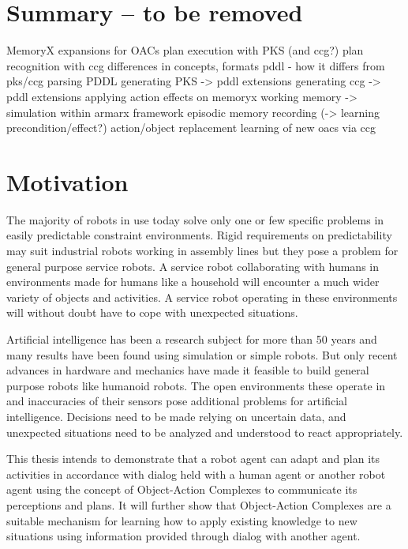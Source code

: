 \documentclass[english,ngerman]{KITreprt}
\begin{document}


\chapter{Summary -- to be removed}
MemoryX expansions for OACs
plan execution with PKS (and ccg?)
plan recognition with ccg
differences in concepts, formats
pddl - how it differs from pks/ccg
parsing PDDL
generating PKS
-> pddl extensions
generating ccg
-> pddl extensions
applying action effects on memoryx working memory
-> simulation within armarx framework
episodic memory recording (-> learning precondition/effect?)
action/object replacement
learning of new oacs via ccg

\maketitle


\tableofcontents
\chapter{Motivation}
The majority of robots in use today solve only one or few specific problems in
easily predictable constraint environments. Rigid requirements on predictability
may suit industrial robots working in assembly lines but they pose a problem for
general purpose service robots. A service robot collaborating with humans in
environments made for humans like a household will encounter a much wider variety
of objects and activities. A service robot operating in these environments will
without doubt have to cope with unexpected situations.

Artificial intelligence has been a research subject for more than 50 years and
many results have been found using simulation or simple robots. But only recent
advances in hardware and mechanics have made it feasible to build general
purpose robots like humanoid robots. The open environments these operate in and
inaccuracies of their sensors pose additional problems for artificial
intelligence. Decisions need to be made relying on uncertain data, and unexpected
situations need to be analyzed and understood to react appropriately.

This thesis intends to demonstrate that a robot agent can adapt and plan its
activities in accordance with dialog held with a human agent or another robot
agent using the concept of Object-Action Complexes to communicate its
perceptions and plans. It will further show that Object-Action Complexes are a
suitable mechanism for learning how to apply existing knowledge to new
situations using information provided through dialog with another agent.
\end{document}
